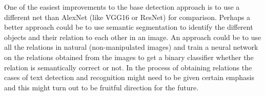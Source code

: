 \documentclass{article}
\begin{document}
One of the easiest improvements to the base detection approach is to use a different net than AlexNet (like VGG16 or ResNet) for comparison. Perhaps a better approach could be to use semantic segmentation to identify the different objects and their relation to each other in an image. An approach could be to use all the relations in natural (non-manipulated images) and train a neural network on the relations obtained from the images to get a binary classifier whether the relation is semantically correct or not. In the process of obtaining relations the cases of text detection and recognition might need to be given certain emphasis and this might turn out to be fruitful direction for the future.




\end{document}
